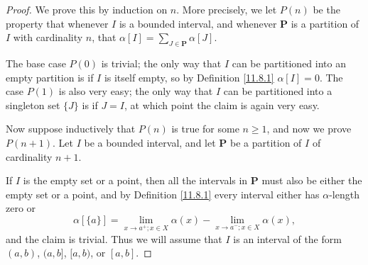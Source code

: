 \begin{proof}
    We prove this by induction on \(n\).
    More precisely, we let \(P(n)\) be the property that whenever \(I\) is a bounded interval, and whenever \(\mathbf{P}\) is a partition of \(I\) with cardinality \(n\), that \(\alpha[I] = \sum_{J \in \mathbf{P}} \alpha[J]\).

    The base case \(P(0)\) is trivial;
    the only way that \(I\) can be partitioned into an empty partition is if \(I\) is itself empty, so by Definition \ref{11.8.1} \(\alpha[I] = 0\).
    The case \(P(1)\) is also very easy;
    the only way that \(I\) can be partitioned into a singleton set \(\{J\}\) is if \(J = I\), at which point the claim is again very easy.

    Now suppose inductively that \(P(n)\) is true for some \(n \geq 1\), and now we prove \(P(n + 1)\).
    Let \(I\) be a bounded interval, and let \(\mathbf{P}\) be a partition of \(I\) of cardinality \(n + 1\).

    If \(I\) is the empty set or a point, then all the intervals in \(\mathbf{P}\) must also be either the empty set or a point, and by Definition \ref{11.8.1} every interval either has \(\alpha\)-length zero or
    \[
        \alpha[\{a\}] = \lim_{x \to a^+ ; x \in X} \alpha(x) - \lim_{x \to a^- ; x \in X} \alpha(x),
    \]
    and the claim is trivial.
    Thus we will assume that \(I\) is an interval of the form \((a, b)\), \((a, b]\), \([a, b)\), or \([a, b]\).


\end{proof}
